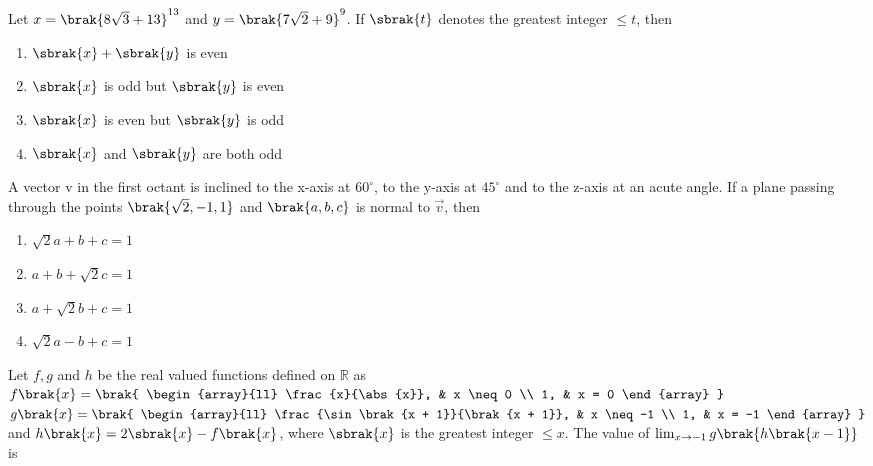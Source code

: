 \item Let $x = \brak{ 8\sqrt{3} + 13}^{13}$ and $y = \brak{7\sqrt{2} + 9}^9$. If $\sbrak{t}$ denotes the greatest integer $\leq t$, then   \hfill {}

\begin{multicols}{2}
\begin{enumerate}
    \item $\sbrak{x} + \sbrak{y}$ is even
    \item $\sbrak{x}$ is odd but $\sbrak{y}$ is even
    \item $\sbrak{x}$ is even but $\sbrak{y}$ is odd
    \item $\sbrak{x}$ and $\sbrak{y}$ are both odd
\end{enumerate}
\end{multicols}


\item A vector v in the first octant is inclined to the x-axis at $60^\circ$, to the y-axis at $45^\circ$ and to the z-axis at an acute angle. If a plane passing through the points $\brak{\sqrt{2}, -1, 1}$ and $\brak{a, b, c}$ is normal to $\overrightarrow{v}$, then   \hfill {}

\begin{multicols}{2}
\begin{enumerate}
    \item $\sqrt{2}a + b + c = 1$
    \item $a + b + \sqrt{2}c = 1$
    \item $a + \sqrt{2}b + c = 1$
    \item $\sqrt{2}a - b + c = 1$
\end{enumerate}
\end{multicols}

\item Let $f, g$ and $h$ be the real valued functions defined on $\mathbb{R}$ as $f \brak{x} = \brak{ 
\begin{array}{ll}
\frac{x}{\abs{x}}, & x \neq 0 \\
1, & x = 0 
\end{array}
}$ \\
$g \brak{x} = \brak{ 
\begin{array}{ll}
\frac{\sin \brak{x + 1}}{\brak{x + 1}}, & x \neq -1 \\
1, & x = -1 
\end{array}
}$ and $h\brak{x} = 2\sbrak{x} - f\brak{x}$, where $\sbrak{x}$ is the greatest integer $\leq x$. The value of $\lim_{x \to -1} g \brak{h \brak{x - 1}} $ is   \hfill {}


